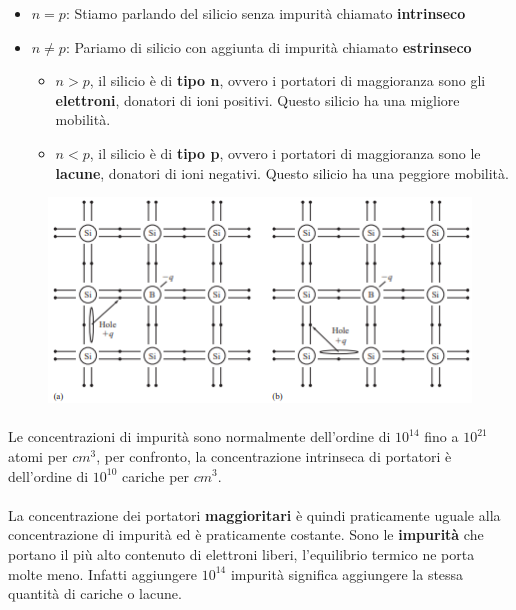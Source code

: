 \begin{itemize}
    \item $n = p$: Stiamo parlando del silicio senza impurità chiamato \textbf{intrinseco}
    \item $n \neq p$: Pariamo di silicio con aggiunta di impurità chiamato \textbf{estrinseco}
    \begin{itemize}
        \item[] $n > p$, il silicio è di \textbf{tipo n}, ovvero i portatori di maggioranza sono gli \textbf{elettroni}, donatori di ioni positivi. Questo silicio ha una migliore mobilità.
        \item[] $n < p$, il silicio è di \textbf{tipo p}, ovvero i portatori di maggioranza sono le \textbf{lacune}, donatori di ioni negativi. Questo silicio ha una peggiore mobilità.
    \end{itemize}
\end{itemize}
\newpage
\begin{figure}[htbp]
    \centering
    \includegraphics[width=0.75\linewidth]{img/boiro_energia.png}       
\end{figure}

\paragraph{}
Le concentrazioni di impurità sono normalmente dell'ordine di $10^{14}$ fino a $10^{21}$ atomi per $cm^3$, per confronto, la	concentrazione	intrinseca	di	portatori	è	dell'ordine	di	$10^{10}$ cariche	per	$cm^3$.
\paragraph{}
La	concentrazione	dei	portatori	\textbf{maggioritari} è	quindi	praticamente	uguale	alla	concentrazione	di	impurità	ed	è	
praticamente	costante. Sono le \textbf{impurità} che portano il più alto contenuto di elettroni liberi, l'equilibrio termico ne porta molte meno. Infatti aggiungere $10^{14}$ impurità significa aggiungere la stessa quantità di cariche o lacune.

